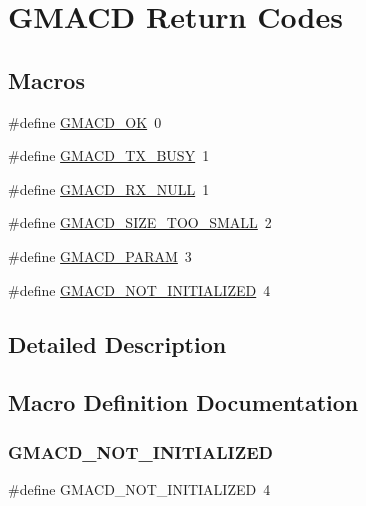 \hypertarget{group__gmacd__rc}{}\section{G\+M\+A\+CD Return Codes}
\label{group__gmacd__rc}
\subsection*{Macros}
\begin{DoxyCompactItemize}
\item 
\#define \mbox{\hyperlink{group__gmacd__rc_ga537377699799715047f8136c4281bb9e}{G\+M\+A\+C\+D\+\_\+\+OK}}~0
\item 
\#define \mbox{\hyperlink{group__gmacd__rc_ga5dba5b6b412b2b6c63eb97ac4935b3aa}{G\+M\+A\+C\+D\+\_\+\+T\+X\+\_\+\+B\+U\+SY}}~1
\item 
\#define \mbox{\hyperlink{group__gmacd__rc_ga95a6de686b008a79ca550b3ed8862575}{G\+M\+A\+C\+D\+\_\+\+R\+X\+\_\+\+N\+U\+LL}}~1
\item 
\#define \mbox{\hyperlink{group__gmacd__rc_gaccb3938fe9eb1709aed1f5847f84acb6}{G\+M\+A\+C\+D\+\_\+\+S\+I\+Z\+E\+\_\+\+T\+O\+O\+\_\+\+S\+M\+A\+LL}}~2
\item 
\#define \mbox{\hyperlink{group__gmacd__rc_gacd28c710654c84370c2c7f2ecbbd269b}{G\+M\+A\+C\+D\+\_\+\+P\+A\+R\+AM}}~3
\item 
\#define \mbox{\hyperlink{group__gmacd__rc_ga41dc1f06beb52206539ee6df73e8aaba}{G\+M\+A\+C\+D\+\_\+\+N\+O\+T\+\_\+\+I\+N\+I\+T\+I\+A\+L\+I\+Z\+ED}}~4
\end{DoxyCompactItemize}


\subsection{Detailed Description}


\subsection{Macro Definition Documentation}
\mbox{\label{group__gmacd__rc_ga41dc1f06beb52206539ee6df73e8aaba}} 
\subsubsection{\texorpdfstring{GMACD\_NOT\_INITIALIZED}{GMACD\_NOT\_INITIALIZED}}
{\footnotesize\ttfamily \#define G\+M\+A\+C\+D\+\_\+\+N\+O\+T\+\_\+\+I\+N\+I\+T\+I\+A\+L\+I\+Z\+ED~4}

